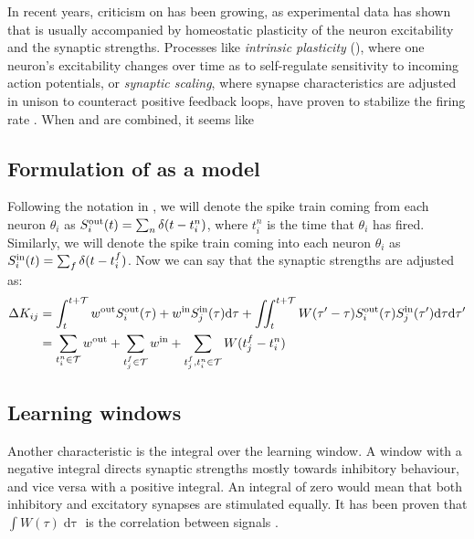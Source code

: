 In recent years, criticism on \STDP has been growing, as experimental data has shown that \STDP is usually accompanied by homeostatic plasticity of the neuron excitability and the synaptic strengths. Processes like \textsl{intrinsic plasticity} (\IP), where one neuron's excitability changes over time as to self-regulate sensitivity to incoming action potentials, or \textsl{synaptic scaling}, where synapse characteristics are adjusted in unison to counteract positive feedback loops, have proven to stabilize the firing rate \cite{ChrolCannon2014, Kirkwood2019}. When \STDP and \IP are combined, it seems like 


\subsection{Formulation of \STDP as a model}
Following the notation in \cite{Kempter1999}, we will denote the spike train coming from each neuron $\theta_i$ as $S_i^{\rm out}(t) = \sum_{n} \delta (t-t_{i}^{n})$, where $t_{i}^{n}$ is the time that $\theta_i$ has fired. Similarly, we will denote the spike train coming into each neuron $\theta_i$ as $S_i^{\rm in}(t) = \sum_{f} \delta (t-t_{i}^{f})$. Now we can say that the synaptic strengths are adjusted as:
\begin{align}
\Delta K_{ij} &= \int_{t}^{t+\mathcal{T}} w^{\rm{out}} S_i^{\rm out}(\tau) + w^{\rm{in}} S_{j}^{\rm {in}}(\tau) \mathrm{d}\tau
+ \iint_{t}^{t+\mathcal{T}} W( \tau^\prime - \tau) S_{i}^{\rm out}(\tau) S_{j}^{\rm in}( \tau^\prime) \mathrm{d} \tau \mathrm{d} \tau^\prime
\label{eq:KempterSTDPFormulation1} \\
&= \sum_{t_i^{n}\in \mathcal{T}} w^{\mathrm{out}} + \sum_{t_{j}^{f} \in \mathcal{T}} w^{\mathrm{in}} + \sum_{t_{j}^{f}, t_i^{n} \in \mathcal{T}} W (t_{j}^{f}-t_i^{n} ) \label{eq:KempterSTDPFormulation2}
\end{align}


\subsection{Learning windows}
Another characteristic is the integral over the learning window. A window with a negative integral directs synaptic strengths mostly towards inhibitory behaviour, and vice versa with a positive integral. An integral of zero would mean that both inhibitory and excitatory synapses are stimulated equally. It has been proven that $\int W(\tau) \mathop{d\tau}$ is the correlation between signals \cite{Gerstner2002}. \\

